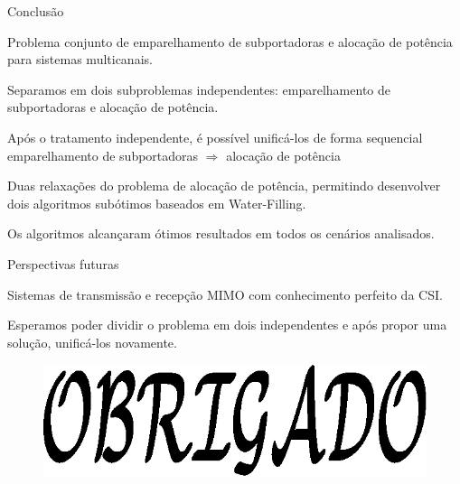%

\begin{frame}{Conclusão}
\begin{bigitem}
  \item Problema conjunto de emparelhamento de subportadoras e alocação de potência para sistemas multicanais.
  \item Separamos em dois subproblemas independentes: emparelhamento de subportadoras e alocação de potência.
  \item Após o tratamento independente, é possível unificá-los de forma sequencial\\
 emparelhamento de subportadoras $\Rightarrow$ alocação de potência
  \item Duas relaxações do problema de alocação de potência, permitindo desenvolver dois algoritmos subótimos baseados em Water-Filling.
  \item Os algoritmos alcançaram ótimos resultados em todos os cenários analisados.
\end{bigitem}
\end{frame}

\begin{frame}{Perspectivas futuras}
\begin{bigitem}
  \item Sistemas de transmissão e recepção MIMO com conhecimento perfeito da CSI.
  \item Esperamos poder dividir o problema em dois independentes e após propor uma solução, unificá-los novamente.
\end{bigitem}
\end{frame}

\begin{frame}
  \begin{figure}[!htb]
    \centering
    \includegraphics[width=0.60\linewidth]{../Imagens/obrigado.eps}    
   \end{figure}
\end{frame}